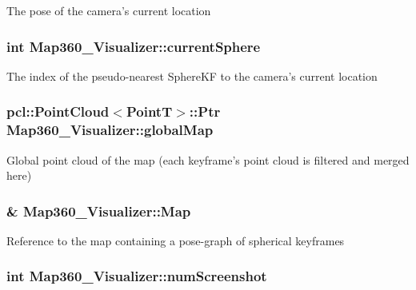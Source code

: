 The pose of the camera's current location \hypertarget{classMap360__Visualizer_a5aaaa8aa47c18934cf366e5bb3ceb2be}{
\subsubsection[{current\-Sphere}]{\setlength{\rightskip}{0pt plus 5cm}int Map360\-\_\-\-Visualizer\-::current\-Sphere}}\label{classMap360__Visualizer_a5aaaa8aa47c18934cf366e5bb3ceb2be}
The index of the pseudo-\/nearest Sphere\-K\-F to the camera's current location \hypertarget{classMap360__Visualizer_a8295556bb6814e8c7e510b0ae66beb6e}{
\subsubsection[{global\-Map}]{\setlength{\rightskip}{0pt plus 5cm}pcl\-::\-Point\-Cloud$<$Point\-T$>$\-::Ptr Map360\-\_\-\-Visualizer\-::global\-Map}}\label{classMap360__Visualizer_a8295556bb6814e8c7e510b0ae66beb6e}
Global point cloud of the map (each keyframe's point cloud is filtered and merged here) \hypertarget{classMap360__Visualizer_ad423e3bba917cfed4b8a7f08a27a0a15}{
\subsubsection[{Map}]{\& Map360\-\_\-\-Visualizer\-::\-Map}}\label{classMap360__Visualizer_ad423e3bba917cfed4b8a7f08a27a0a15}
Reference to the map containing a pose-\/graph of spherical keyframes \hypertarget{classMap360__Visualizer_aec44a88b16240561335ba7c6b34f8cf5}{
\subsubsection[{num\-Screenshot}]{\setlength{\rightskip}{0pt plus 5cm}int Map360\-\_\-\-Visualizer\-::num\-Screenshot}}\label{classMap360__Visualizer_aec44a88b16240561335ba7c6b34f8cf5}
